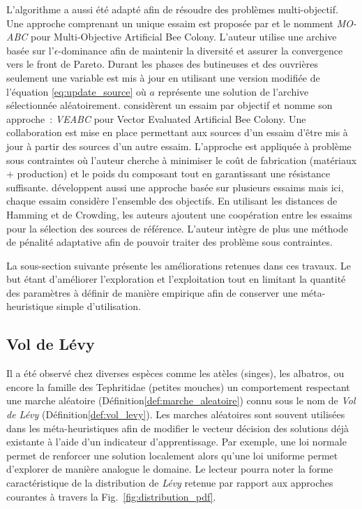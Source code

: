 L’algorithme a aussi été adapté afin de résoudre des problèmes multi-objectif. Une
approche comprenant un unique essaim est proposée par \cite{Akbari201239} et le nomment
\textit{MO-ABC} pour Multi-Objective Artificial Bee Colony. L’auteur utilise une archive
basée sur l’$\epsilon$-dominance afin de maintenir la diversité et assurer la convergence
vers le front de Pareto. Durant les phases des butineuses et des ouvrières seulement une
variable est mis à jour en utilisant une version modifiée de l’équation
\eqref{eq:update_source} où $a$ représente une solution de l’archive sélectionnée
aléatoirement.
\cite{Omkar2011489} considèrent un essaim par objectif et nomme son approche~: \textit{VEABC}
pour Vector Evaluated Artificial Bee Colony. Une collaboration est mise en place
permettant aux sources d’un essaim d’être mis à jour à partir des sources d’un autre
essaim. L’approche est appliquée à problème sous contraintes où l’auteur cherche à
minimiser le coût de fabrication (matériaux + production) et le poids du composant tout en
garantissant une résistance suffisante.
\cite{Zhang20121} développent aussi une approche basée sur plusieurs essaims mais ici,
chaque essaim considère l’ensemble des objectifs. En utilisant les distances de Hamming et
de Crowding, les auteurs ajoutent une coopération entre les essaims pour la sélection des
sources de référence. L’auteur intègre de plus une méthode de pénalité adaptative
\parencite{Woldesenbet20073077} afin de pouvoir traiter des problème sous contraintes.

La sous-section suivante présente les améliorations retenues dans ces travaux.
Le but étant d’améliorer l’exploration et l’exploitation tout en limitant la
quantité des paramètres à définir de manière empirique afin de conserver une
méta-heuristique simple d’utilisation.
\FloatBarrier



\subsection{Vol de Lévy} %
\label{sub:vol_de_levy}
Il a été observé chez diverses espèces comme les atèles (singes), les albatros,
ou encore la famille des Tephritidae (petites mouches) un comportement respectant
une marche aléatoire (Définition\ref{def:marche_aleatoire}) connu sous le nom de
\textit{Vol de Lévy} (Définition\ref{def:vol_levy}).
Les marches aléatoires sont souvent utilisées dans les méta-heuristiques afin de
modifier le vecteur décision des solutions déjà existante à l’aide
d’un indicateur d’apprentissage. Par exemple, une loi normale permet
de renforcer une solution localement alors qu’une loi uniforme permet d’explorer
de manière analogue le domaine. Le lecteur pourra noter la forme caractéristique
de la distribution de \textit{Lévy} retenue par rapport aux approches courantes à travers
la Fig.~\ref{fig:distribution_pdf}.

